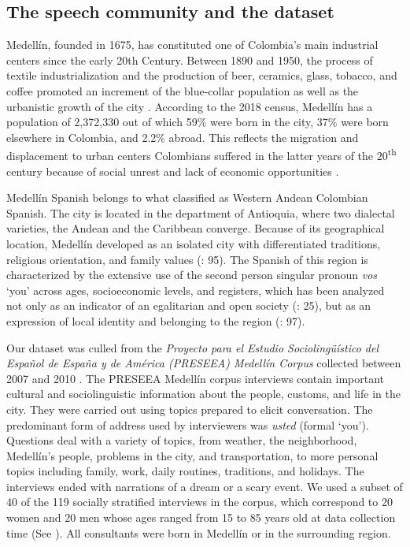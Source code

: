 \documentclass[output=paper]{langscibook}
\begin{document}
\subsection{The speech community and the dataset}\label{sec:orozco:3.1}


Medellín, founded in 1675, has constituted one of Colombia’s main industrial centers since the early 20th Century. Between 1890 and 1950, the process of textile industrialization and the production of beer, ceramics, glass, tobacco, and coffee promoted an increment of the blue-collar population as well as the urbanistic growth of the city \citep[8-10]{Botero1996}. According to the 2018 census, Medellín has a population of 2,372,330 out of which 59\% were born in the city, 37\% were born elsewhere in Colombia, and 2.2\% abroad. This reflects the migration and displacement to urban centers Colombians suffered in the latter years of the 20\textsuperscript{th} century because of social unrest and lack of economic opportunities \parencites[]{DepartamentoAdministrativoNacionaldeEstadísticaDANE2019}[82]{Castañeda2005}. 



Medellín Spanish belongs to what  \citet{MontesGiraldo1982} classified as Western Andean Colombian Spanish. The city is located in the department of Antioquia, where two dialectal varieties, the Andean and the Caribbean converge. Because of its geographical location, Medellín developed as an isolated city with differentiated traditions, religious orientation, and family values (\citealt{FernándezAcosta2020}: 95). The Spanish of this region is characterized by the extensive use of the second person singular pronoun \textit{vos} ‘you’ across ages, socioeconomic levels, and registers, which has been analyzed not only as an indicator of an egalitarian and open society (\citealt{MontesGiraldo1967}: 25), but as an expression of local identity and belonging to the region (\citealt{FernándezAcosta2020}: 97). 



Our dataset was culled from the \textit{Proyecto para el Estudio Sociolingüístico del Español de España y de América (PRESEEA) Medellín Corpus} collected between 2007 and 2010 \citep{González-Rátiva2008}. The PRESEEA Medellín corpus interviews contain important cultural and sociolinguistic information about the people, customs, and life in the city. They were carried out using topics prepared to elicit conversation. The predominant form of address used by interviewers was \textit{usted} (formal ‘you’). Questions deal with a variety of topics, from weather, the neighborhood, Medellín’s people, problems in the city, and transportation, to more personal topics including family, work, daily routines, traditions, and holidays. The interviews ended with narrations of a dream or a scary event. We used a subset of 40 of the 119 socially stratified interviews in the corpus, which correspond to 20 women and 20 men whose ages ranged from 15 to 85 years old at data collection time (See ). All consultants were born in Medellín or in the surrounding region. 
\end{document}
